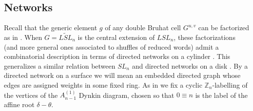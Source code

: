 \documentclass[12pt]{amsart}
\newcommand{\ZZ}{\mathbb{Z}}
\theoremstyle{remark}
\numberwithin{equation}{section}
\numberwithin{figure}{section}
\begin{document}
\subsection{Networks}\label{sec:networks}
Recall that the generic element $g$ of any double Bruhat cell $G^{u,v}$ can be factorized as in .
When $G = \widetilde{LSL}_n$ is the central extension of $LSL_n$, these factorizations (and more general ones associated to shuffles of reduced words) admit a combinatorial description in terms of directed networks on a cylinder \cite{GSV12,FM14}.
This generalizes a similar relation between $SL_n$ and directed networks on a disk \cite{FZ99}.
By a directed network on a surface we will mean an embedded directed graph whose edges are assigned weights in some fixed ring.
As in  we fix a cyclic $\ZZ_n$-labelling of the vertices of the $A_{n-1}^{\!(1)}$ Dynkin diagram, chosen so that $0 \equiv n$ is the label of the affine root $\delta - \theta$.
\end{document}
